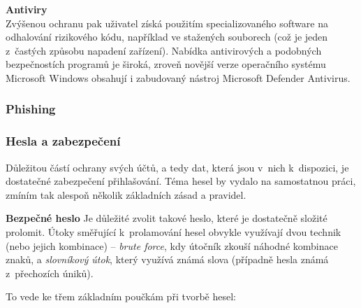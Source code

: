 \textbf{Antiviry}\\
Zvýšenou ochranu pak uživatel získá použitím specializovaného software na odhalování rizikového kódu, například ve stažených souborech (což je jeden z~častých způsobu napadení zařízení). Nabídka antivirových a podobných bezpečnostích programů je široká, zroveň novější verze operačního systému Microsoft Windows obsahují i zabudovaný nástroj Microsoft Defender Antivirus.

\subsubsection*{Phishing}



\subsubsection*{Hesla a zabezpečení}
Důležitou částí ochrany svých účtů, a tedy dat, která jsou v~nich k~dispozici, je dostatečné zabezpečení přihlašování. Téma hesel by vydalo na samostatnou práci, zmíním tak alespoň několik základních zásad a pravidel.


\textbf{Bezpečné heslo}
Je důležité zvolit takové heslo, které je dostatečně složité prolomit. Útoky směřující k~prolamování hesel obvykle využívají dvou technik (nebo jejich kombinace) -- \textit{brute force}, kdy útočník zkouší náhodné kombinace znaků, a \textit{slovníkový útok}, který využívá známá slova (případně hesla známá z~přechozích úniků).

To vede ke třem základním poučkám při tvorbě hesel:

